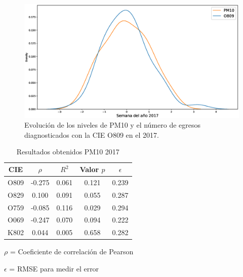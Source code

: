 \documentclass[3p,times]{elsarticle}
\begin{document}
\begin{figure}[h!]
\setcounter{figure}{2} %
\begin{center}
   \includegraphics[width=1\textwidth]{PM10_O809_2017.eps}
   \end{center}
    \caption[Series de tiempo 2017 PM10 y O809]{Evolución de los niveles de PM10 y el número de egresos diagnosticados con la CIE O809 en el 2017.}
    \label{serie_de_tiempo_2017_PM10}
\end{figure}

\begin{table}[hbt!]
\centering
\caption{Resultados obtenidos PM10 2017}
\label{tab:Resultados obtenidos PM10 2017}
\vspace{0.5cm}
\begin{threeparttable}
\begin{tabular}{|c|c|c|c|c|}
	\hline
	CIE & $\rho$ & $R^2$ & Valor $p$ & $\epsilon$\\
	\hline
	O809 & -0.275 & 0.061 & 0.121 & 0.239 \\
	\hline
	O829 & 0.100 & 0.091 & 0.055 & 0.287 \\
	\hline
	O759 & -0.085 & 0.116 & 0.029 & 0.294 \\
	\hline
	O069 & -0.247 & 0.070 & 0.094 & 0.222 \\
	\hline
	K802 & 0.044 & 0.005 & 0.658 & 0.282 \\
	\hline
\end{tabular}
\begin{tablenotes}
\footnotesize
\item{$\rho$ = Coeficiente de correlación de Pearson}
\item{$\epsilon$ = RMSE para medir el error}
\end{tablenotes}
\end{threeparttable}
\end{table}
\end{document}
